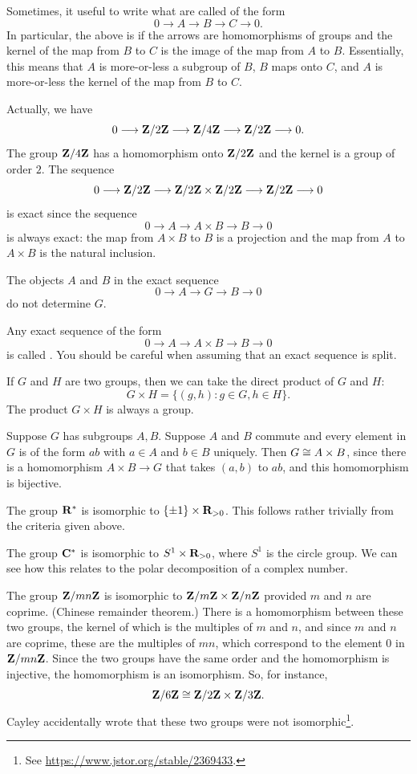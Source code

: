 \documentclass[11pt, oneside]{amsart}
\begin{document}
Sometimes, it useful to write what are called {} of the form
$$
0\longrightarrow A \longrightarrow B\longrightarrow C\longrightarrow 0.
$$
In particular, the above is  if the arrows are homomorphisms of groups and the kernel of the map from $B$ to $C$ is the image of the map from $A$ to $B$. Essentially, this means that $A$ is more-or-less a subgroup of $B$, $B$ maps onto $C$, and $A$ is more-or-less the kernel of the map from $B$ to $C$. 

Actually, we have
$$
0\longrightarrow\mathbf Z/2\mathbf Z \longrightarrow \mathbf Z/4\mathbf Z \longrightarrow \mathbf Z/2\mathbf Z \longrightarrow 0.
$$
The group $\mathbf Z/4\mathbf Z$ has a homomorphism onto $\mathbf Z/2\mathbf Z$ and the kernel is a group of order $2$. The sequence
$$
0\longrightarrow\mathbf Z/2\mathbf Z \longrightarrow \mathbf Z/2\mathbf Z \times \mathbf Z/2\mathbf Z\longrightarrow \mathbf Z/2\mathbf Z \longrightarrow 0
$$
is exact since the sequence 
$$
0\longrightarrow A\longrightarrow A\times B \longrightarrow B\longrightarrow 0
$$
is always exact: the map from $A\times B$ to $B$ is a projection and the map from $A$ to $A\times B$ is the natural inclusion.
\begin{warning}
The objects $A$ and $B$ in the exact sequence
$$
0 \longrightarrow A \longrightarrow G\longrightarrow B \longrightarrow 0
$$
do not determine $G$.
\end{warning}

Any exact sequence of the form 
$$
0\longrightarrow A\longrightarrow A\times B \longrightarrow B\longrightarrow 0
$$
is called . You should be careful when assuming that an exact sequence is split.

If $G$ and $H$ are two groups, then we can take the direct product of $G$ and $H$:
$$
G\times H = \{ (g,h) : g\in G,h\in H\}.
$$
The product $G\times H$ is always a group.

Suppose $G$ has subgroups $A,B$. Suppose $A$ and $B$ commute and every element in $G$ is of the form $ab$ with $a\in A$ and $b\in B$ uniquely. Then $G\cong A\times B$, since there is a homomorphism $A\times B\longrightarrow G$ that takes $(a,b)$ to $ab$, and this homomorphism is bijective. 

The group $\mathbf R^*$ is isomorphic to $\{\pm 1\} \times \mathbf R_{>0}$. This follows rather trivially from the criteria given above.

The group $\mathbf C^*$ is isomorphic to $S^1 \times \mathbf R_{>0}$, where $S^1$ is the circle group. We can see how this relates to the polar decomposition of a complex number.

The group $\mathbf Z/mn\mathbf Z$ is isomorphic to $\mathbf Z/m\mathbf Z\times \mathbf Z/n\mathbf Z$ provided $m$ and $n$ are coprime. ({Chinese remainder theorem}.) There is a homomorphism between these two groups, the kernel of which is the multiples of $m$ and $n$, and since $m$ and $n$ are coprime, these are the multiples of $mn$, which correspond to the element $0$ in $\mathbf Z/mn\mathbf Z$. Since the two groups have the same order and the homomorphism is injective, the homomorphism is an isomorphism. So, for instance, 
$$
\mathbf Z/6\mathbf Z \cong \mathbf Z/2\mathbf Z \times \mathbf Z/3\mathbf Z.
$$
Cayley {accidentally wrote that these two groups were not isomorphic}\footnote{See \url{https://www.jstor.org/stable/2369433}.}.
\end{document}
